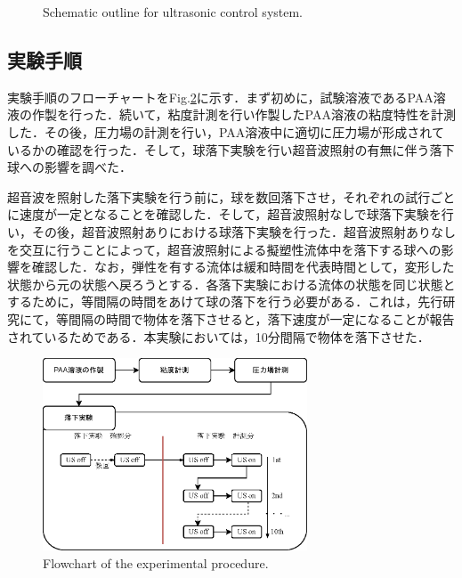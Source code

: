 \begin{figure}[h]
    \centering
    \caption{Schematic outline for ultrasonic control system.}
    \label{fig:connect-with-signal}
\end{figure}

\newpage

\subsection{実験手順}

実験手順のフローチャートをFig.\ref{fig:exp-methods}に示す．まず初めに，試験溶液であるPAA溶液の作製を行った．続いて，粘度計測を行い作製したPAA溶液の粘度特性を計測した．その後，圧力場の計測を行い，PAA溶液中に適切に圧力場が形成されているかの確認を行った．そして，球落下実験を行い超音波照射の有無に伴う落下球への影響を調べた．

超音波を照射した落下実験を行う前に，球を数回落下させ，それぞれの試行ごとに速度が一定となることを確認した．そして，超音波照射なしで球落下実験を行い，その後，超音波照射ありにおける球落下実験を行った．超音波照射ありなしを交互に行うことによって，超音波照射による擬塑性流体中を落下する球への影響を確認した．なお，弾性を有する流体は緩和時間を代表時間として，変形した状態から元の状態へ戻ろうとする．各落下実験における流体の状態を同じ状態とするために，等間隔の時間をあけて球の落下を行う必要がある．これは，先行研究\cite{ref:8-5}にて，等間隔の時間で物体を落下させると，落下速度が一定になることが報告されているためである．本実験においては，10分間隔で物体を落下させた．

\begin{figure}[ht]
    \centering
    \includegraphics[width=0.7\textwidth]{2-Methods/exp-methods.eps}
    \caption{Flowchart of the experimental procedure.}
    \label{fig:exp-methods}
\end{figure}
